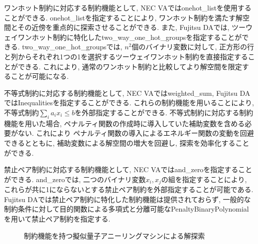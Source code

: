 \documentclass[submit,techrep,noauthor]{ipsj}
\begin{document}
ワンホット制約に対応する制約機能として, NEC VAではonehot\_listを使用することができる. onehot\_listを指定することにより, ワンホット制約を満たす解空間とその近傍を重点的に探索させることができる. また, Fujitsu DAでは, ツーウェイワンホット制約に特化したtwo\_way\_one\_hot\_groupsを指定することができる. two\_way\_one\_hot\_groupsでは, $n^{2}$個のバイナリ変数に対して, 正方形の行と列からそれぞれ1つの1を選択するツーウェイワンホット制約を直接指定することができる. これにより, 通常のワンホット制約と比較してより解空間を限定することが可能になる\cite{komatsu2}.

不等式制約に対応する制約機能として, NEC VAではweighted\_sum, Fujitsu DAではInequalitiesを指定することができる. これらの制約機能を用いることにより, 不等式制約$\sum_{i}a_{i}x_{i}\le b$を外部指定することができる. 不等式制約に対応する制約機能を用いた場合, ペナルティ関数の作成時に導入していた補助変数を含める必要がない. これにより ペナルティ関数の導入によるエネルギー関数の変動を回避できるとともに, 補助変数による解空間の増大を回避し, 探索を効率化することができる.

禁止ペア制約に対応する制約機能として, NEC VAではand\_zeroを指定することができる. and\_zeroでは, 二つのバイナリ変数$x_{i}, x_{j}$の組を指定することにより, これらが共に1にならないとする禁止ペア制約を外部指定することが可能である. Fujitsu DAでは禁止ペア制約に特化した制約機能は提供されておらず, 一般的な制約条件に対して目的関数による多項式と分離可能なPenaltyBinaryPolynomialを用いて禁止ペア制約を指定する.

\begin{figure}[tbp]
\centering
{}
\hspace{5mm}
\caption{制約機能を持つ擬似量子アニーリングマシンによる解探索}
\label{va_search}
\end{figure}
\end{document}
